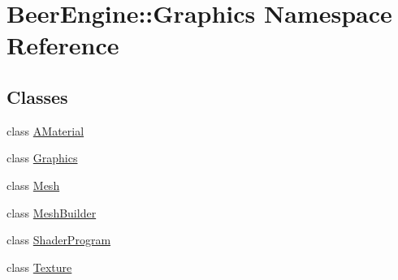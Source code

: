 \hypertarget{namespace_beer_engine_1_1_graphics}{}\section{Beer\+Engine\+:\+:Graphics Namespace Reference}
\label{namespace_beer_engine_1_1_graphics}
\subsection*{Classes}
\begin{DoxyCompactItemize}
\item 
class \mbox{\hyperlink{class_beer_engine_1_1_graphics_1_1_a_material}{A\+Material}}
\item 
class \mbox{\hyperlink{class_beer_engine_1_1_graphics_1_1_graphics}{Graphics}}
\item 
class \mbox{\hyperlink{class_beer_engine_1_1_graphics_1_1_mesh}{Mesh}}
\item 
class \mbox{\hyperlink{class_beer_engine_1_1_graphics_1_1_mesh_builder}{Mesh\+Builder}}
\item 
class \mbox{\hyperlink{class_beer_engine_1_1_graphics_1_1_shader_program}{Shader\+Program}}
\item 
class \mbox{\hyperlink{class_beer_engine_1_1_graphics_1_1_texture}{Texture}}
\end{DoxyCompactItemize}
